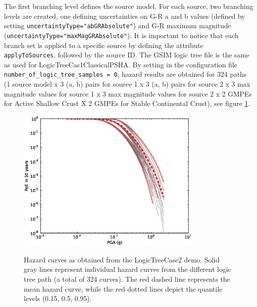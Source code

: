 The first branching level defines the source model. For each source, two branching levels are created, one defining
uncertainties on G-R a and b values (defined by setting \texttt{uncertaintyType="abGRAbsolute"}) and G-R maximum
magnitude (\texttt{uncertaintyType="maxMagGRAbsolute"}). It is important to notice that each branch set is applied
to a specific source by defining the attribute \texttt{applyToSources}, followed by the source ID. The GSIM logic tree file is
the same as used for LogicTreeCas1ClassicalPSHA. By setting in the configuration file \texttt{number\_\-of\_\-logic\_\-tree\_\-samples = 0},
hazard results are obtained for 324 paths (1 source model x 3 (a, b) pairs for source 1 x  3 (a, b) pairs for source 2 x 3 max magnitude values
for source 1 x 3 max magnitude values for source 2 x 2 GMPEs for Active Shallow Crust X 2 GMPEs for Stable Continental Crust), see
figure \ref{fig:hazard_curves}.\\

\begin{figure} 
\centering 
\subcaptionbox{}
{\includegraphics[width=9cm]{./figures/hazard/hazard-curves-ltcase2.eps}} 
\caption{Hazard curves as obtained from the LogicTreeCase2 demo. Solid gray lines represent individual hazard curves from the different
logic tree path (a total of 324 curves). The red dashed line represents the mean hazard curve, while the red dotted lines depict the quantile levels
(0.15, 0.5, 0.95).}
\label{fig:hazard_curves}
\end{figure}

